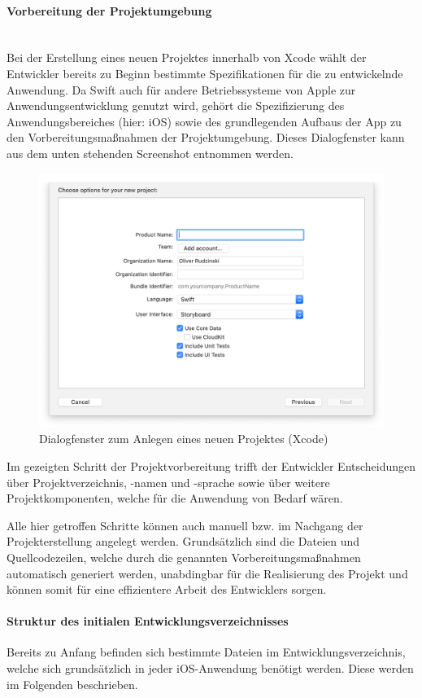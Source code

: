 \paragraph{Vorbereitung der Projektumgebung}\mbox{}\\
Bei der Erstellung eines neuen Projektes innerhalb von Xcode wählt der Entwickler bereits zu Beginn bestimmte Spezifikationen für die zu entwickelnde Anwendung. Da Swift auch für andere Betriebssysteme von Apple zur Anwendungsentwicklung genutzt wird, gehört die Spezifizierung des Anwendungsbereiches (hier: iOS) sowie des grundlegenden Aufbaus der App zu den Vorbereitungsmaßnahmen der Projektumgebung. Dieses Dialogfenster kann aus dem unten stehenden Screenshot entnommen werden.

\begin{figure}[h!]
	\centering
	\includegraphics[width=0.64\linewidth]{img/fig/2-3-3_xcode_start}
	\caption{Dialogfenster zum Anlegen eines neuen Projektes (Xcode)}
\end{figure}

Im gezeigten Schritt der Projektvorbereitung trifft der Entwickler Entscheidungen über Projektverzeichnis, -namen und -sprache sowie über weitere Projektkomponenten, welche für die Anwendung von Bedarf wären.

Alle hier getroffen Schritte können auch manuell bzw. im Nachgang der Projekterstellung angelegt werden. Grundsätzlich sind die Dateien und Quellcodezeilen, welche durch die genannten Vorbereitungsmaßnahmen automatisch generiert werden, unabdingbar für die Realisierung des Projekt und können somit für eine effizientere Arbeit des Entwicklers sorgen.

\paragraph{Struktur des initialen Entwicklungsverzeichnisses} \label{par:xcode-files}
Bereits zu Anfang befinden sich bestimmte Dateien im Entwicklungsverzeichnis, welche sich grundsätzlich in jeder iOS-Anwendung benötigt werden. Diese werden im Folgenden beschrieben.

